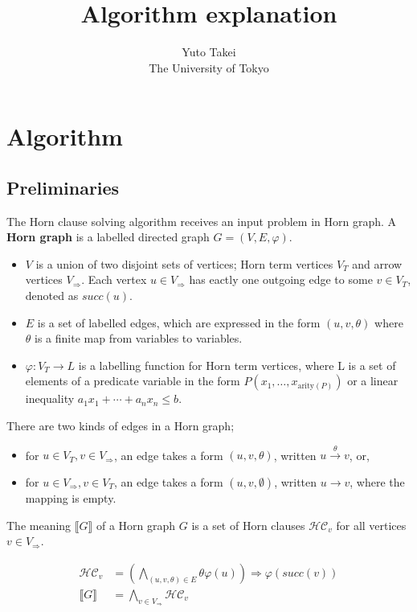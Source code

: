 \documentclass[a4paper,12pt]{article}
\title{Algorithm explanation}
\author{Yuto Takei \\ The University of Tokyo}
\newcommand{\edge}[2]{#1\rightarrow#2}
\newcommand{\edgel}[3]{#1\xrightarrow{#2}#3}
\begin{document}
\maketitle

\section{Algorithm}

\subsection{Preliminaries}

The Horn clause solving algorithm receives an input problem in Horn
graph. A \textbf{Horn graph} is a labelled directed graph $G=(V,E,\varphi)$.
\begin{itemize}
\item $V$ is a union of two disjoint sets of vertices; Horn term
  vertices $V_T$ and arrow vertices $V_\Rightarrow$. Each vertex $u
  \in V_\Rightarrow$ has eactly one outgoing edge to some $v \in V_T$,
  denoted as $succ(u)$.
\item $E$ is a set of labelled edges, which are expressed in the form
  $(u,v,\theta)$ where $\theta$ is a finite map from variables to
  variables.
\item $\varphi: V_T \rightarrow L$ is a labelling function for Horn
  term vertices, where L is a set of elements of a predicate variable
  in the form $P(x_1, \ldots, x_{\mathrm{arity}(P)})$ or a linear
  inequality $a_1 x_1 + \cdots + a_n x_n \leq b$.
\end{itemize}
There are two kinds of edges in a Horn graph;
\begin{itemize}
\item for $u \in V_T, v \in V_\Rightarrow$, an edge takes a form
  $(u,v,\theta)$, written $\edgel{u}{\theta}{v}$, or,
\item for $u \in V_\Rightarrow, v \in V_T$, an edge takes a form
  $(u,v,\emptyset)$, written $\edge{u}{v}$, where the mapping is
  empty.
\end{itemize}

The meaning $\llbracket G \rrbracket $ of a Horn graph $G$ is a set of
Horn clauses $\mathcal{HC}_v$ for all vertices $v \in V_\Rightarrow$.

\begin{align*}
\mathcal{HC}_v & = \left( \bigwedge_{(u,v,\theta) \in E} \theta \varphi(u) \right) \Longrightarrow \varphi(succ(v)) \\
\llbracket G \rrbracket & = \bigwedge_{v \in V_\Rightarrow} \mathcal{HC}_v
\end{align*}
\end{document}
